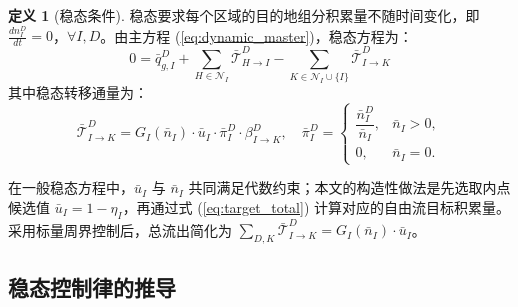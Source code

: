 \documentclass[a4paper,12pt]{article}
\theoremstyle{plain}
\theoremstyle{definition}
\newtheorem{definition}[theorem]{定义}
\theoremstyle{remark}
\begin{document}
\begin{definition}[稳态条件]\label{def:steady_state}
稳态要求每个区域的目的地组分积累量不随时间变化，即 $\frac{dn_I^D}{dt} = 0$，$\forall I, D$。由主方程 (\ref{eq:dynamic_master})，稳态方程为：
\begin{equation}\label{eq:steady_state_eq}
    0 = \bar{q}_{g,I}^D + \sum_{H \in \mathcal{N}_I} \bar{\mathcal{T}}_{H \to I}^D - \sum_{K \in \mathcal{N}_I \cup \{I\}} \bar{\mathcal{T}}_{I \to K}^D
\end{equation}
其中稳态转移通量为：
\begin{equation}\label{eq:steady_transfer}
    \bar{\mathcal{T}}_{I \to K}^D = G_I(\bar{n}_I) \cdot \bar{u}_I \cdot \bar\pi_I^D \cdot \beta_{I \to K}^D,
    \quad
    \bar\pi_I^D=
    \begin{cases}
    \dfrac{\bar n_I^D}{\bar n_I}, & \bar n_I>0,\\[0.8em]
    0, & \bar n_I=0 .
    \end{cases}
\end{equation}
\end{definition}

在一般稳态方程中，$\bar u_I$ 与 $\bar n_I$ 共同满足代数约束；本文的构造性做法是先选取内点候选值 $\bar u_I=1-\eta_I$，再通过式 (\ref{eq:target_total}) 计算对应的自由流目标积累量。采用标量周界控制后，总流出简化为 $\sum_{D,K} \bar{\mathcal{T}}_{I \to K}^D = G_I(\bar{n}_I) \cdot \bar{u}_I$。

\subsection{稳态控制律的推导}
\end{document}
